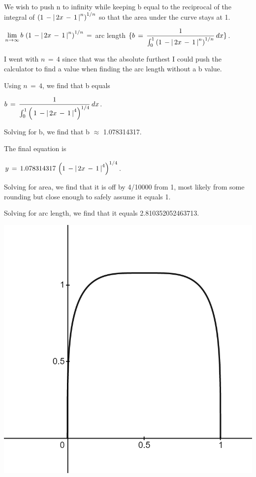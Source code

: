 \documentclass[letterpaper,12pt]{article}
\theoremstyle{definition}
\begin{document}
We wish to push n to infinity while keeping b equal to the reciprocal of the integral of $\left(1\,-\abs{\,2x\,-\,1\,}^n\right)^{1/n}$ so that the area under the curve stays at 1.

\begin{center}
    $\lim\limits_{n \to \infty} b\,\left(1\,-\abs{\,2x\,-\,1\,}^n\right)^{1/n}\,=$ arc length $\{b\,=\,\dfrac{1}{\int_{0}^{1}\left(1\,-\abs{\,2x\,-\,1\,}^n\right)^{1/n}}\,dx\}$.
\end{center}


I went with $n\,=\,4$ since that was the absolute furthest I could push the calculator to find a value when finding the arc length without a b value.

Using $n\,=\,4$, we find that b equals

\begin{center}
    $b\,=\,\dfrac{1}{\int_{0}^{1}\left(\,1\,-\abs{\,2x\,-\,1\,}^4\right)^{1/4}}\,dx$.
\end{center}

Solving for b, we find that b $\approx$ 1.078314317.

\pagebreak

The final equation is

\begin{center}
    $y\,=\,1.078314317\,\left(1\,-\abs{\,2x\,-\,1\,}^4\right)^{1/4}$.
\end{center}

Solving for area, we find that it is off by 4/10000 from 1, most likely from some rounding but close enough to safely assume it equals 1.

Solving for arc length, we find that it equals 2.810352052463713.

\begin{center}
    \includegraphics[scale=0.3]{superellipse.png}
\end{center}
\end{document}
